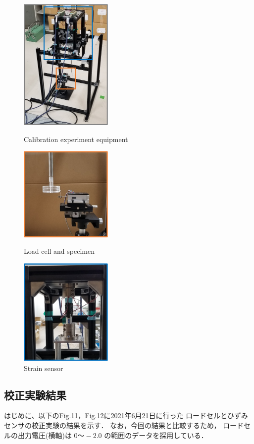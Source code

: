 \documentclass[twocolumn,a4j]{jsarticle}
\begin{document}
\begin{figure}[htbp]
    \footnotesize
    \begin{center}
        \includegraphics[width=45mm]{../images/image_05.png}
        \caption{Calibration experiment equipment}
        \includegraphics[width=45mm]{../images/image_06.png}
        \caption{Load cell and specimen}
        \includegraphics[width=45mm]{../images/image_07.png}
        \caption{Strain sensor}
    \end{center}
\end{figure}

\newpage

\subsection{校正実験結果}
はじめに、以下のFig.11，Fig.12に2021年6月21日に行った
ロードセルとひずみセンサの校正実験の結果を示す．
なお，今回の結果と比較するため，
ロードセルの出力電圧(横軸)は $0 ～ -2.0$ の範囲のデータを採用している．\\
\end{document}
